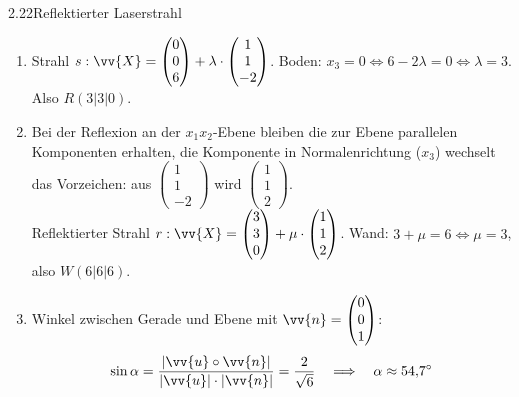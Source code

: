 \begin{loesung}{2.22}{Reflektierter Laserstrahl}
\begin{enumerate}[label=\alph*)]
  \item Strahl $s: \vv{X} = \begin{pmatrix} 0\\ 0\\ 6\end{pmatrix}+\lambda\cdot\begin{pmatrix} 1\\ 1\\ -2\end{pmatrix}$. Boden: $x_3 = 0\Longleftrightarrow 6-2\lambda = 0\Longleftrightarrow\lambda = 3$. Also $R(3|3|0)$.
  \item Bei der Reflexion an der $x_1x_2$-Ebene bleiben die zur Ebene parallelen Komponenten erhalten, die Komponente in Normalenrichtung ($x_3$) wechselt das Vorzeichen: aus $\begin{pmatrix} 1\\ 1\\ -2\end{pmatrix}$ wird $\begin{pmatrix} 1\\ 1\\ 2\end{pmatrix}$.\\
  Reflektierter Strahl $r: \vv{X} = \begin{pmatrix} 3\\ 3\\ 0\end{pmatrix}+\mu\cdot\begin{pmatrix} 1\\ 1\\ 2\end{pmatrix}$. Wand: $3+\mu = 6\Longleftrightarrow\mu = 3$, also $W(6|6|6)$.
  \item Winkel zwischen Gerade und Ebene mit $\vv{n} = \begin{pmatrix} 0\\ 0\\ 1\end{pmatrix}$:
  \[\sin{\alpha} = \dfrac{|\vv{u}\circ\vv{n}|}{|\vv{u}|\cdot|\vv{n}|} = \dfrac{2}{\sqrt{6}}\quad\Longrightarrow\quad\alpha\approx 54{,}7^\circ\]
\end{enumerate}
\end{loesung}

\LoesungskapitelEnde
